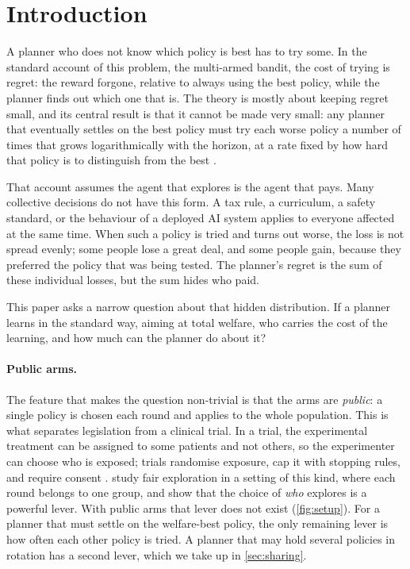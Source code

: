\documentclass[11pt,a4paper]{article}
\theoremstyle{plain}
\theoremstyle{definition}
\theoremstyle{remark}
\begin{document}
\section{Introduction}\label{sec:intro}

A planner who does not know which policy is best has to try some. In the standard account of this problem, the multi-armed bandit, the cost of trying is regret: the reward forgone, relative to always using the best policy, while the planner finds out which one that is. The theory is mostly about keeping regret small, and its central result is that it cannot be made very small: any planner that eventually settles on the best policy must try each worse policy a number of times that grows logarithmically with the horizon, at a rate fixed by how hard that policy is to distinguish from the best \citep{lai1985}.

That account assumes the agent that explores is the agent that pays. Many collective decisions do not have this form. A tax rule, a curriculum, a safety standard, or the behaviour of a deployed AI system applies to everyone affected at the same time. When such a policy is tried and turns out worse, the loss is not spread evenly; some people lose a great deal, and some people gain, because they preferred the policy that was being tested. The planner's regret is the sum of these individual losses, but the sum hides who paid.

This paper asks a narrow question about that hidden distribution. If a planner learns in the standard way, aiming at total welfare, who carries the cost of the learning, and how much can the planner do about it?

\paragraph{Public arms.} The feature that makes the question non-trivial is that the arms are \emph{public}: a single policy is chosen each round and applies to the whole population. This is what separates legislation from a clinical trial. In a trial, the experimental treatment can be assigned to some patients and not others, so the experimenter can choose who is exposed; trials randomise exposure, cap it with stopping rules, and require consent \citep{freedman1987}. \citet{baek2021,baek2024} study fair exploration in a setting of this kind, where each round belongs to one group, and show that the choice of \emph{who} explores is a powerful lever. With public arms that lever does not exist (\cref{fig:setup}). For a planner that must settle on the welfare-best policy, the only remaining lever is how often each other policy is tried. A planner that may hold several policies in rotation has a second lever, which we take up in \cref{sec:sharing}.
\end{document}
